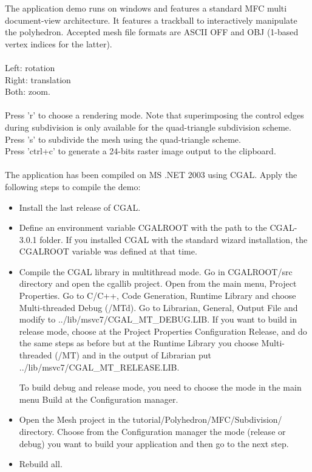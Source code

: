 The application demo runs on windows and features a standard MFC multi
document-view architecture. It features a trackball to interactively
manipulate the polyhedron. Accepted mesh file formats are ASCII OFF
and OBJ (1-based vertex indices for the latter). \\

\\
Left: rotation\\
Right: translation\\
Both: zoom.\\

\\
Press 'r' to choose a rendering mode. Note that superimposing the
control edges during subdivision is only available for the
quad-triangle subdivision scheme.\\
Press 's' to subdivide the mesh using the quad-triangle scheme.\\
Press 'ctrl+c' to generate a 24-bits raster image output to the clipboard.\\

\\
The application has been compiled on MS .NET 2003 using CGAL. Apply
the following steps to compile the demo:
\begin{itemize}
\item Install the last release of CGAL.
\item Define an environment variable CGALROOT with the path to the CGAL-3.0.1 folder. If you installed CGAL with the standard wizard installation, the CGALROOT variable was defined at that time.
\item Compile the CGAL library in multithread mode. Go in CGALROOT/src directory and open the cgallib project. Open from the main menu, Project Properties. Go to C/C++, Code Generation, Runtime Library and choose Multi-threaded Debug (/MTd). Go to Librarian, General, Output File and modify to ../lib/msvc7/CGAL\_MT\_DEBUG.LIB. If you want to build in release mode, choose at the Project Properties Configuration Release, and do the same steps as before but at the Runtime Library you choose Multi-threaded (/MT) and in the output of Librarian put ../lib/msvc7/CGAL\_MT\_RELEASE.LIB.

To build debug and release mode, you need to choose the mode in the main menu Build at the Configuration manager.

\item Open the Mesh project in the tutorial/Polyhedron/MFC/Subdivision/ directory. Choose from the Configuration manager the mode (release or debug) you want to build your application and then go to the next step.
\item Rebuild all.
\end{itemize}

